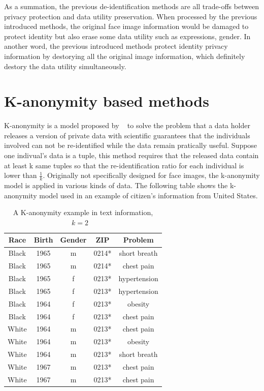 	\par
	As a summation, the previous de-identification methods are all trade-offs between privacy protection and data utility preservation. When processed by the previous introduced methods, the original face image information would be damaged to protect identity but also erase some data utility such as expressions, gender. In another word, the previous introduced methods protect identity privacy information by destorying all the original image information, which definitely destory the data utility simultaneously. 

\section{K-anonymity based methods}
	K-anonymity is a model proposed by ~\cite{Sweeney02} to solve the problem that a data holder releases a version of private data with scientific guarantees that the individuals involved can not be re-identified while the data remain pratically useful. Suppose one indivual's data is a tuple, this method requires that the released data contain at least k same tuples so that the re-identification ratio for each individual is lower than $\frac{1}{k}$. Originally not specifically designed for face images, the k-anonymity model is applied in various kinds of data. The following table shows the k-anonymity model used in an example of citizen's information from United States. 
		\begin{table}[!htb]
		\centering
			\begin{tabular}{|c|c|c|c|c|}
				\hline
				\textbf{Race} & \textbf{Birth} & \textbf{Gender} & \textbf{ZIP} & \textbf{Problem} \\
				\hline
				Black & 1965 & m & 0214* & short breath \\
				\hline
				Black & 1965 & m & 0214* & chest pain \\
				\hline
				Black & 1965 & f & 0213* & hypertension \\
				\hline
				Black & 1965 & f & 0213* & hypertension \\
				\hline
				Black & 1964 & f & 0213* & obesity \\
				\hline
				Black & 1964 & f & 0213* & chest pain \\
				\hline
				White & 1964 & m & 0213* & chest pain \\
				\hline
				White & 1964 & m & 0213* & obesity \\
				\hline
				White & 1964 & m & 0213* & short breath \\
				\hline
				White & 1967 & m & 0213* & chest pain \\
				\hline
				White & 1967 & m & 0213* & chest pain \\
				\hline
			\end{tabular}
			\caption{A K-anonymity example in text information, $k = 2$ ~\cite{Sweeney02}} 
		\end{table}	

